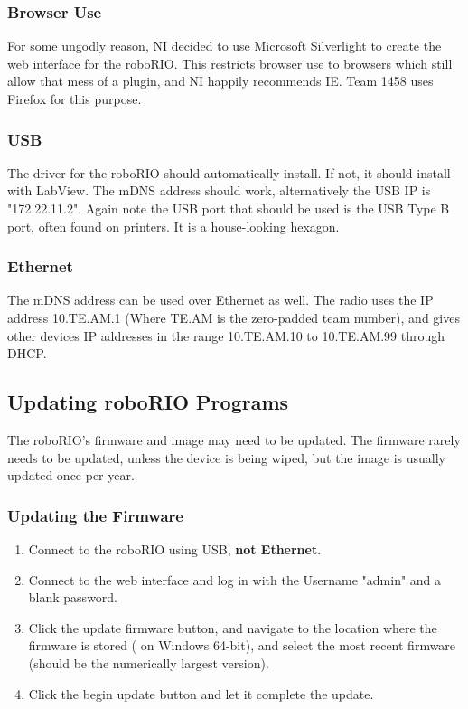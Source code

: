 \documentclass[]{report}
\begin{document}
\subsubsection{Browser Use}
For some ungodly reason, NI decided to use Microsoft Silverlight to create the web interface for the roboRIO.
This restricts browser use to browsers which still allow that mess of a plugin, and NI happily recommends IE.
Team 1458 uses Firefox for this purpose.

\subsubsection{USB}
The driver for the roboRIO should automatically install. If not, it should install with LabView.
The mDNS address should work, alternatively the USB IP is "172.22.11.2".
Again note the USB port that should be used is the USB Type B port, often found on printers.
It is a house-looking hexagon.

\subsubsection{Ethernet}
The mDNS address can be used over Ethernet as well.
The radio uses the IP address 10.TE.AM.1 (Where TE.AM is the zero-padded team number), and gives other devices IP addresses in the range 10.TE.AM.10 to 10.TE.AM.99 through DHCP.

\subsection{Updating roboRIO Programs}
The roboRIO's firmware and image may need to be updated.
The firmware rarely needs to be updated, unless the device is being wiped, but the image is usually updated once per year.

\subsubsection{Updating the Firmware}
\begin{enumerate}
\item Connect to the roboRIO using USB, \textbf{not Ethernet}.
\item Connect to the web interface and log in with the Username "admin" and a blank password.
\item Click the update firmware button, and navigate to the location where the firmware is stored
( on Windows 64-bit),
and select the most recent firmware (should be the numerically largest version).
\item Click the begin update button and let it complete the update.
\end{enumerate}
\end{document}
